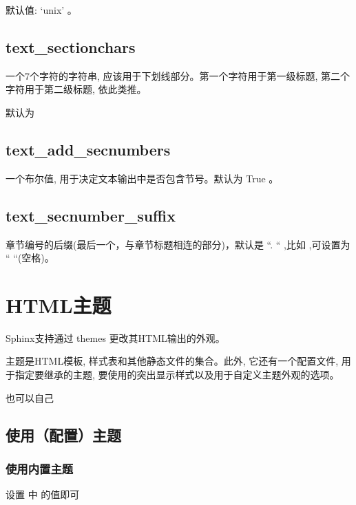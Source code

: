 \documentclass[a4paper,10pt,english]{sphinxmanual}
\begin{document}
\sphinxAtStartPar
默认值: ‘unix’ 。


\subsection{text\_sectionchars}
\label{\detokenize{sphinx_conf:text-sectionchars}}
\sphinxAtStartPar
一个7个字符的字符串, 应该用于下划线部分。第一个字符用于第一级标题, 第二个字符用于第二级标题, 依此类推。

\sphinxAtStartPar
默认为 


\subsection{text\_add\_secnumbers}
\label{\detokenize{sphinx_conf:text-add-secnumbers}}
\sphinxAtStartPar
一个布尔值, 用于决定文本输出中是否包含节号。默认为 True 。


\subsection{text\_secnumber\_suffix}
\label{\detokenize{sphinx_conf:text-secnumber-suffix}}
\sphinxAtStartPar
章节编号的后缀(最后一个，与章节标题相连的部分)，默认是 “. “ ,比如  ,可设置为 “ “(空格)。


\section{HTML主题}
\label{\detokenize{sphinx_conf:id10}}
\sphinxAtStartPar
Sphinx支持通过 themes 更改其HTML输出的外观。

\sphinxAtStartPar
主题是HTML模板, 样式表和其他静态文件的集合。此外, 它还有一个配置文件, 用于指定要继承的主题, 要使用的突出显示样式以及用于自定义主题外观的选项。

\sphinxAtStartPar
也可以自己 


\subsection{使用（配置）主题}
\label{\detokenize{sphinx_conf:id12}}

\subsubsection{使用内置主题}
\label{\detokenize{sphinx_conf:id13}}
\sphinxAtStartPar
设置  中  的值即可
\end{document}
